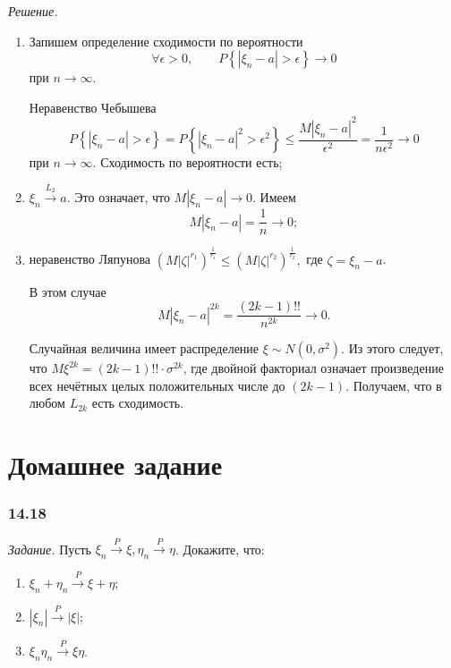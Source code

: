 \textit{Решение.}
\begin{enumerate}[label=\alph*)]
\item Запишем определение сходимости по вероятности
$$ \forall \epsilon > 0,
\qquad P \left\{ \left| \xi_n - a \right| > \epsilon \right\} \rightarrow 0$$
при $n \rightarrow \infty $.

Неравенство Чебышева
$$P \left\{ \left| \xi_n - a \right| > \epsilon \right\} =
P \left\{ \left| \xi_n - a \right|^2 > \epsilon^2 \right\} \leq
\frac{M \left| \xi_n - a \right|^2}{ \epsilon^2} =
\frac{1}{n \epsilon^2} \rightarrow
0$$
при $n \to \infty $.
Сходимость по вероятности есть;
\item $ \xi_n \overset{L_2}{ \rightarrow } a$.
Это означает, что $M \left| \xi_n - a \right| \rightarrow 0$.
Имеем
$$M \left| \xi_n - a \right| =
\frac{1}{n} \rightarrow
0;$$
\item неравенство Ляпунова
$ \left( M \left| \zeta \right|^{r_1} \right)^{ \frac{1}{r_1}} \leq \left( M \left| \zeta \right|^{r_2} \right)^{ \frac{1}{r_2}},$ где $ \zeta = \xi_n - a$.

В этом случае
$$M \left| \xi_n - a \right|^{2k} =
\frac{ \left( 2k-1 \right)!!}{n^{2k}} \rightarrow
0.$$

Случайная величина имеет распределение $ \xi \sim N \left( 0, \sigma^2 \right) $.
Из этого следует, что $M \xi^{2k} = \left( 2k-1 \right)!! \cdot \sigma^{2k}$,
где двойной факториал означает произведение всех нечётных целых положительных числе до $ \left( 2k-1 \right) $.
Получаем, что в любом $L_{2k}$ есть сходимость.
\end{enumerate}

\section*{Домашнее задание}

\subsubsection*{14.18}

\textit{Задание.} Пусть $ \xi_n \overset{P}{ \rightarrow } \xi, \eta_n \overset{P}{ \rightarrow } \eta$.
Докажите, что:
\begin{enumerate}[label=\alph*)]
\item $ \xi_n + \eta_n \overset{P}{ \rightarrow } \xi + \eta$;
\item $ \left| \xi_n \right| \overset{P}{ \rightarrow } \left| \xi \right| $;
\item $ \xi_n \eta_n \overset{P}{ \rightarrow } \xi \eta $.
\end{enumerate}


